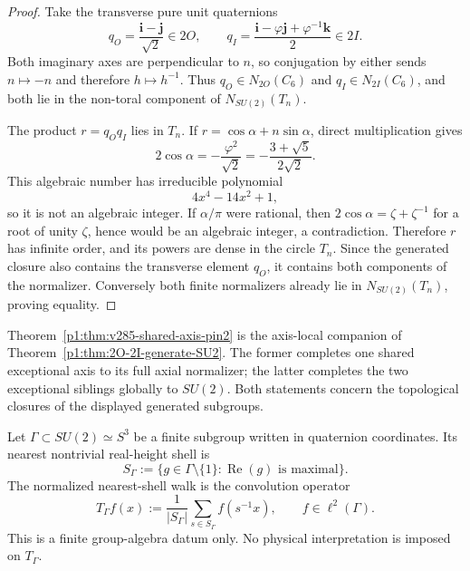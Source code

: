 \documentclass[11pt]{article}
\begin{document}
\begin{proof}
Take the transverse pure unit quaternions
\[
 q_O=\frac{\mathbf i-\mathbf j}{\sqrt2}\in2O,
 \qquad
 q_I=\frac{\mathbf i-\varphi\mathbf j+\varphi^{-1}\mathbf k}{2}\in2I.
\]
Both imaginary axes are perpendicular to \(n\), so conjugation by either
sends \(n\mapsto-n\) and therefore \(h\mapsto h^{-1}\).  Thus
\(q_O\in N_{2O}(C_6)\) and \(q_I\in N_{2I}(C_6)\), and both lie in the
non-toral component of \(N_{SU(2)}(T_n)\).

The product \(r=q_Oq_I\) lies in \(T_n\).  If
\(r=\cos\alpha+n\sin\alpha\), direct multiplication gives
\[
 2\cos\alpha=-\frac{\varphi^2}{\sqrt2}
 =-\frac{3+\sqrt5}{2\sqrt2}.
\]
This algebraic number has irreducible polynomial
\[
 4x^4-14x^2+1,
\]
so it is not an algebraic integer.  If \(\alpha/\pi\) were rational, then
\(2\cos\alpha=\zeta+\zeta^{-1}\) for a root of unity \(\zeta\), hence would
be an algebraic integer, a contradiction.  Therefore \(r\) has infinite
order, and its powers are dense in the circle \(T_n\).  Since the generated
closure also contains the transverse element \(q_O\), it contains both
components of the normalizer.  Conversely both finite normalizers already lie
in \(N_{SU(2)}(T_n)\), proving equality.
\end{proof}

\begin{remark}
Theorem~\ref{p1:thm:v285-shared-axis-pin2} is the axis-local companion of
Theorem~\ref{p1:thm:2O-2I-generate-SU2}.  The former completes one shared
exceptional axis to its full axial normalizer; the latter completes the two
exceptional siblings globally to \(SU(2)\).  Both statements concern the
topological closures of the displayed generated subgroups.
\end{remark}

\begin{definition}
\label{p1:def:nearest-shell-walk}
Let \(\Gamma\subset SU(2)\simeq S^3\) be a finite subgroup written in quaternion
coordinates.  Its nearest nontrivial real-height shell is
\[
    S_\Gamma:=\{g\in \Gamma\setminus\{1\}:\operatorname{Re}(g)
    \text{ is maximal}\}.
\]
The normalized nearest-shell walk is the convolution operator
\[
    T_\Gamma f(x):=\frac{1}{|S_\Gamma|}
    \sum_{s\in S_\Gamma} f(s^{-1}x),
    \qquad f\in \ell^2(\Gamma).
\]
This is a finite group-algebra datum only.  No physical interpretation is imposed on \(T_\Gamma\).
\end{definition}
\end{document}
